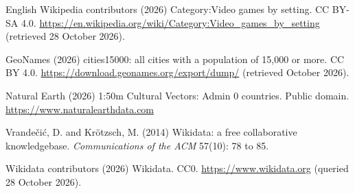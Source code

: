 \documentclass[11pt,a4paper]{article}
\begin{document}
English Wikipedia contributors (2026) Category:Video games by setting. CC BY-SA 4.0. \url{https://en.wikipedia.org/wiki/Category:Video_games_by_setting} (retrieved 28 October 2026).

GeoNames (2026) cities15000: all cities with a population of 15,000 or more. CC BY 4.0. \url{https://download.geonames.org/export/dump/} (retrieved October 2026).

Natural Earth (2026) 1:50m Cultural Vectors: Admin 0 countries. Public domain. \url{https://www.naturalearthdata.com}

Vrandečić, D. and Krötzsch, M. (2014) Wikidata: a free collaborative knowledgebase. \emph{Communications of the ACM} 57(10): 78 to 85.

Wikidata contributors (2026) Wikidata. CC0. \url{https://www.wikidata.org} (queried 28 October 2026).
\end{document}
